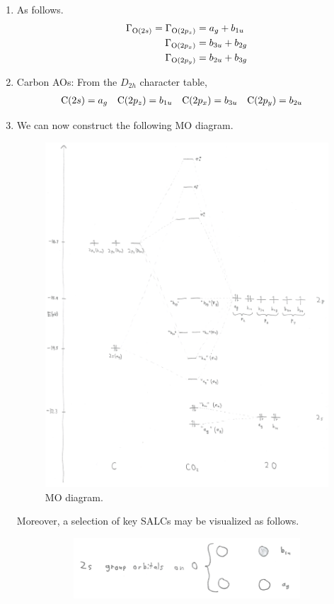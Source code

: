 \documentclass[../notes.tex]{subfiles}
\begin{document}
\begin{itemize}
\begin{enumerate}
\begin{itemize}
        \end{itemize}
        \item As follows.
        \begin{align*}
            \Gamma_{\ce{O}(2s)} = \Gamma_{\ce{O}(2p_z)} &= a_g+b_{1u}\\
            \Gamma_{\ce{O}(2p_x)} &= b_{3u}+b_{2g}\\
            \Gamma_{\ce{O}(2p_y)} &= b_{2u}+b_{3g}
        \end{align*}
        \item Carbon AOs: From the $D_{2h}$ character table,
        \begin{align*}
            \ce{C}(2s) &= a_g&
            \ce{C}(2p_z) &= b_{1u}&
            \ce{C}(2p_x) &= b_{3u}&
            \ce{C}(2p_y) &= b_{2u}
        \end{align*}
        \item We can now construct the following MO diagram.
        \begin{figure}[H]
            \centering
            \includegraphics[width=0.7\linewidth]{../ExtFiles/MOsCO2.png}
            \caption{ MO diagram.}
            \label{fig:MOsCO2}
        \end{figure}
        Moreover, a selection of key SALCs may be visualized as follows.
        \begin{figure}[H]
            \centering
            \begin{subfigure}[b]{0.49\linewidth}
                \centering
                \includegraphics[width=0.8\linewidth]{../ExtFiles/CO2SALCa.png}

\end{subfigure}
\end{figure}
\end{enumerate}
\end{itemize}
\end{document}
